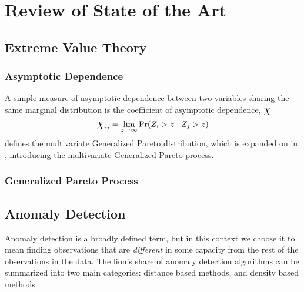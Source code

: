 
\section{Review of State of the Art}
\subsection{Extreme Value Theory}
\subsubsection{Asymptotic Dependence}
A simple measure of asymptotic dependence between two variables sharing the same
  marginal distribution is the coefficient of asymptotic dependence, $\mbox{\Large$\chi$}$
\begin{equation}
    \mbox{\Large$\chi$}_{ij} = \lim_{z\rightarrow\infty}\text{Pr}(Z_i > z \mid Z_j > z)
\end{equation}
\cite{rootzen2006} defines the multivariate Generalized Pareto distribution,
which is expanded on in \cite{ferreira2014}, introducing the multivariate
Generalized Pareto process.



\subsubsection{Generalized Pareto Process}




\subsection{Anomaly Detection}
Anomaly detection is a broadly defined term, but in this context we choose it to
  mean finding observations that are \emph{different} in some capacity from the
  rest of the observations in the data.  The lion's share of anomaly detection
  algorithms can be summarized into two main categories: distance based methods,
  and density based methods.

